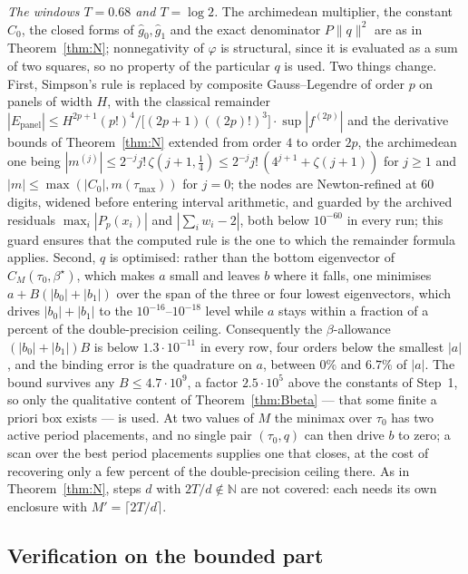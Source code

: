 \documentclass[11pt]{amsart}
\theoremstyle{definition}
\theoremstyle{remark}
\newcommand{\N}{\mathbb N}
\newcommand{\gh}[1]{\widehat g_{#1}}
\begin{document}
\emph{The windows $T=0.68$ and $T=\log2$.} The archimedean multiplier, the constant $C_0$, the closed forms of
$\gh0,\gh1$ and the exact denominator $P\|q\|^2$ are as in Theorem~\ref{thm:N}; nonnegativity of
$\varphi$ is structural, since it is evaluated as a sum of two squares, so no property of the
particular $q$ is used. Two things change. First, Simpson's rule is replaced by composite
Gauss--Legendre of order $p$ on panels of width $H$, with the classical remainder
$|E_{\mathrm{panel}}|\le H^{2p+1}(p!)^4\big/\big[(2p+1)((2p)!)^3\big]\cdot\sup|f^{(2p)}|$ and the
derivative bounds of Theorem~\ref{thm:N} extended from order $4$ to order $2p$, the archimedean one
being $|m^{(j)}|\le2^{-j}j!\,\zeta(j+1,\frac14)\le2^{-j}j!\,(4^{j+1}+\zeta(j+1))$ for $j\ge1$ and
$|m|\le\max(|C_0|,m(\tau_{\max}))$ for $j=0$; the nodes are Newton-refined at $60$ digits, widened
before entering interval arithmetic, and guarded by the archived residuals
$\max_i|P_p(x_i)|$ and $|\sum_iw_i-2|$, both below $10^{-60}$ in every run; this guard ensures that the
computed rule is the one to which the remainder formula applies. Second, $q$ is optimised: rather than the bottom eigenvector of
$C_M(\tau_0,\beta^\star)$, which makes $a$ small and leaves $b$ where it falls, one minimises
$a+B(|b_0|+|b_1|)$ over the span of the three or four lowest eigenvectors, which drives
$|b_0|+|b_1|$ to the $10^{-16}$--$10^{-18}$ level while $a$ stays within a fraction of a percent of
the double-precision ceiling. Consequently the $\beta$-allowance $(|b_0|+|b_1|)B$ is below
$1.3\cdot10^{-11}$ in every row, four orders below the smallest $|a|$, and the binding error is the
quadrature on $a$, between $0\%$ and $6.7\%$ of $|a|$. The bound survives any $B\le4.7\cdot10^9$,
a factor $2.5\cdot10^5$ above the constants of Step~1, so only the qualitative content of
Theorem~\ref{thm:Bbeta} --- that some finite a priori box exists --- is used. At two values of $M$
the minimax over $\tau_0$ has two active period placements, and no single pair $(\tau_0,q)$ can then
drive $b$ to zero; a scan over the best period placements supplies one that closes, at the cost of
recovering only a few percent of the double-precision ceiling there. As in Theorem~\ref{thm:N},
steps $d$ with $2T/d\notin\N$ are not covered: each needs its own enclosure with
$M'=\lceil2T/d\rceil$.

\subsection{Verification on the bounded part}
\end{document}
